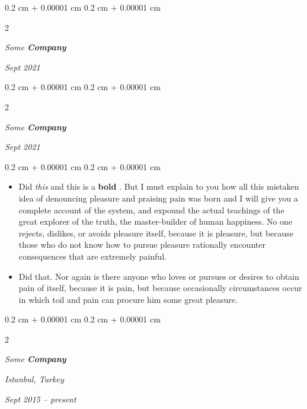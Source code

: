 \documentclass[10pt, letterpaper]{article}
\newenvironment{highlights}{
    \begin{itemize}[
        topsep=0.10 cm,
        parsep=0.10 cm,
        partopsep=0pt,
        itemsep=0pt,
        leftmargin=0.4 cm + 10pt
    ]
}{
    \end{itemize}
} %
\newenvironment{onecolentry}{
    \begin{adjustwidth}{
        0.2 cm + 0.00001 cm
    }{
        0.2 cm + 0.00001 cm
    }
}{
    \end{adjustwidth}
} %
\newenvironment{twocolentry}[2][]{
    \onecolentry
    \def\secondColumn{#2}
    \setcolumnwidth{\fill, 4.5 cm}
    \begin{paracol}{2}
}{
    \switchcolumn \raggedleft \secondColumn
    \end{paracol}
    \endonecolentry
} %
\let\hrefWithoutArrow\href
\renewcommand{\href}[2]{\hrefWithoutArrow{#1}{\ifthenelse{\equal{#2}{}}{ }{#2 }\raisebox{.15ex}{\footnotesize \faExternalLink*}}}
\begin{document}
        \vspace{0.2 cm}

            \begin{twocolentry}{


        \textit{Sept 2021}    }
                \textbf{}

                \textit{Some \textbf{Company}}
            \end{twocolentry}



        \vspace{0.2 cm}

            \begin{twocolentry}{


        \textit{Sept 2021}    }
                \textbf{}

                \textit{Some \textbf{Company}}
            \end{twocolentry}

        \vspace{0.10 cm}
        \begin{onecolentry}
            \begin{highlights}
                \item Did \textit{this} and this is a \textbf{bold} \href{https://example.com}{link}. But I must explain to you how all this mistaken idea of denouncing pleasure and praising pain was born and I will give you a complete account of the system, and expound the actual teachings of the great explorer of the truth, the master-builder of human happiness. No one rejects, dislikes, or avoids pleasure itself, because it is pleasure, but because those who do not know how to pursue pleasure rationally encounter consequences that are extremely painful.
                \item Did that. Nor again is there anyone who loves or pursues or desires to obtain pain of itself, because it is pain, but because occasionally circumstances occur in which toil and pain can procure him some great pleasure.
            \end{highlights}
        \end{onecolentry}


        \vspace{0.2 cm}

            \begin{twocolentry}{
        \textit{Istanbul, Turkey}

        \textit{Sept 2015 – present}    }
                \textbf{}

                \textit{Some \textbf{Company}}
            \end{twocolentry}
\end{document}
